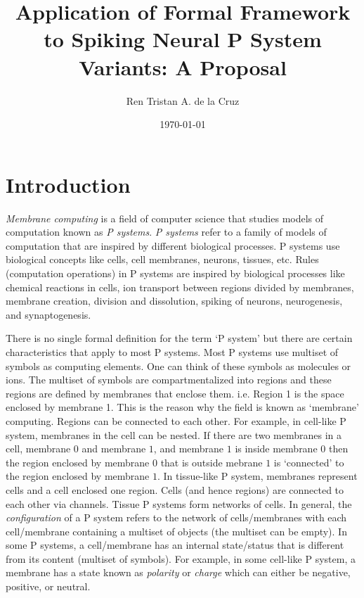 \documentclass[12pt,A4]{article}
\title
{
   Application of Formal Framework to Spiking Neural P System Variants: A Proposal
}
\author
{
   Ren Tristan A. de la Cruz
}
\date
{
   \today
}
\begin{document}
\maketitle


\section{Introduction}

\emph{Membrane computing} is a field of computer science that studies models of computation known as
\emph{P systems}. \emph{P systems} refer to a family of models of computation that are inspired by 
different biological processes. P systems use biological concepts like cells, cell membranes, neurons, 
tissues, etc. Rules (computation operations) in P systems are inspired by biological processes like
chemical reactions in cells, ion transport between regions divided by membranes, membrane creation,
division and dissolution, spiking of neurons, neurogenesis, and synaptogenesis.  

There is no single formal definition for the term `P system' but there are certain characteristics
that apply to most P systems. Most P systems use multiset of symbols as computing elements. One can
think of these symbols as molecules or ions. The multiset of symbols are compartmentalized into 
regions and these regions are defined by membranes that enclose them. i.e. Region 1 is the space
enclosed by membrane 1. This is the reason why the field is known as `membrane' computing. Regions
can be connected to each other. For example, in cell-like P system, membranes in the cell can be
nested. If there are two membranes in a cell, membrane $0$ and membrane $1$, and membrane $1$ is 
inside membrane $0$ then the region enclosed by membrane $0$ that is outside mebrane $1$ is 
`connected' to the region enclosed by membrane $1$. In tissue-like P system, membranes represent 
cells and a cell enclosed one region. Cells (and hence regions) are connected to each other via 
channels. Tissue P systems form networks of cells. In general, the \emph{configuration} of a P 
system refers to the network of cells/membranes with each cell/membrane containing a multiset of 
objects (the multiset can be empty). In some P systems, a cell/membrane has an internal state/status
that is different from its content (multiset of symbols). For example, in some cell-like P system, 
a membrane has a state known as \emph{polarity} or \emph{charge} which can either be negative, 
positive, or neutral.
\end{document}

